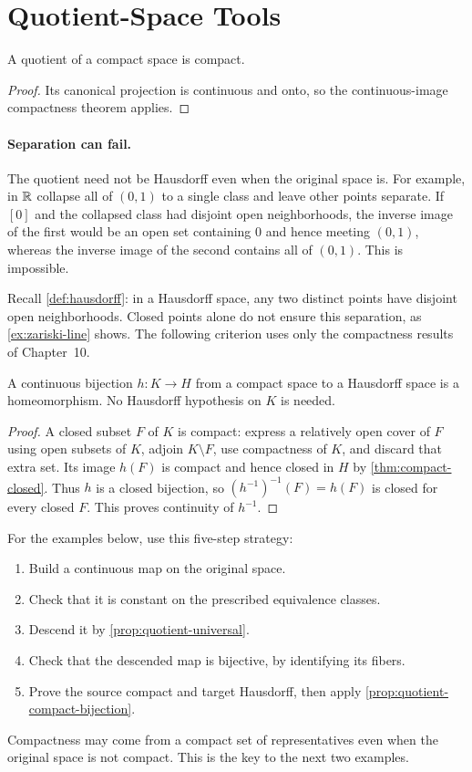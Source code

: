 \section{Quotient-Space Tools}\label{sec:quotient-tools}
\begin{proposition}
A quotient of a compact space is compact.
\end{proposition}
\begin{proof}
Its canonical projection is continuous and onto, so the continuous-image
compactness theorem applies.
\end{proof}
\paragraph{Separation can fail.} The quotient need not be Hausdorff even when the
original space is. For example, in $\mathbb{R}$ collapse all of $(0,1)$ to a single
class and leave other points separate. If $[0]$ and the collapsed class had
disjoint open neighborhoods, the inverse image of the first would be an
open set containing $0$ and hence meeting $(0,1)$, whereas the inverse image
of the second contains all of $(0,1)$. This is impossible.

Recall \cref{def:hausdorff}: in a Hausdorff space, any two distinct
points have disjoint open neighborhoods. Closed points alone do not
ensure this separation, as \cref{ex:zariski-line} shows. The following
criterion uses only the compactness results of Chapter~10.
\begin{proposition}\label{prop:quotient-compact-bijection}
A continuous bijection $h:K\to H$ from a compact space to a Hausdorff
space is a homeomorphism. No Hausdorff hypothesis on $K$ is needed.
\end{proposition}
\begin{proof}
A closed subset $F$ of $K$ is compact: express a relatively open cover
of $F$ using open subsets of $K$, adjoin $K\setminus F$, use compactness
of $K$, and discard that extra set.
Its image $h(F)$ is compact and hence closed in $H$ by
\cref{thm:compact-closed}. Thus $h$ is a closed bijection, so
$(h^{-1})^{-1}(F)=h(F)$ is closed for every closed $F$. This proves
continuity of $h^{-1}$.
\end{proof}
For the examples below, use this five-step strategy:
\begin{enumerate}
\item Build a continuous map on the original space.
\item Check that it is constant on the prescribed equivalence classes.
\item Descend it by \cref{prop:quotient-universal}.
\item Check that the descended map is bijective, by identifying its fibers.
\item Prove the source compact and target Hausdorff, then apply
\cref{prop:quotient-compact-bijection}.
\end{enumerate}
Compactness may come from a compact set of representatives even when the
original space is not compact. This is the key to the next two examples.

